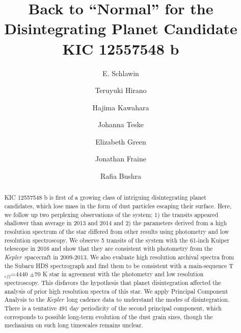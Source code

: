 \documentclass[preprint,trackchanges]{aastex61}
\newcommand{\kepler}{{\it Kepler}}
\begin{document}
\title{Back to ``Normal'' for the Disintegrating Planet Candidate KIC 12557548 \MakeLowercase{b}}



\author{E. Schlawin}

\author{Teruyuki Hirano}

\author{Hajima Kawahara}

\author{Johanna Teske}

\author{Elizabeth Green}

\author{Jonathan Fraine}

\author{Rafia Bushra}

\begin{abstract}
KIC 12557548 b is first of a growing class of intriguing disintegrating planet candidates, which lose mass in the form of  dust particles escaping their surface.
Here, we follow up two perplexing observations of the system: 1) the transits appeared shallower than average in 2013 and 2014 and 2) the parameters derived from a high resolution spectrum of the star differed from other results using photometry and low resolution spectroscopy.
We observe 5 transits of the system with the 61-inch Kuiper telescope in 2016 and show that they are consistent with photometry from the \kepler\ spacecraft in 2009-2013.
We also evaluate high resolution archival spectra from the Subaru HDS spectrograph and find them to be consistent with a main-sequence T$_{eff}$=4440 $\pm$70 K star in agreement with the photometry and low resolution spectroscopy.
This disfavors the hypothesis that planet disintegration affected the analysis of prior high resolution spectra of this star.
We apply Principal Component Analysis to the \kepler\ long cadence data to understand the modes of disintegration.
There is a tentative 491 day periodicity of the second principal component, which corresponds to possible long-term evolution of the dust grain sizes, though the mechanism on such long timescales remains unclear.
\end{abstract}
\end{document}

